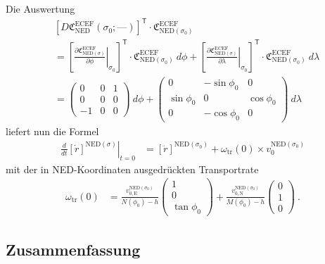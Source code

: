 \documentclass[10pt,a4paper]{article}
\newcommand{\nul}{\textrm{---}}
\newcommand{\trans}{^\mathsf{T}}
\begin{document}
Die Auswertung
\begin{align}
	&\left[
		D\mathfrak{C}^{\mathrm{ECEF}}_{\mathrm{NED}}
		\left(
			\sigma_0;
			\nul
		\right)
	\right]\trans
	\cdot
	\mathfrak{C}^{\mathrm{ECEF}}_{\mathrm{NED}(\sigma_0)}
	\nonumber\\
	&=
	\left[	
	\left.
	\frac{\partial \mathfrak{C}^{\mathrm{ECEF}}_{\mathrm{NED}(\sigma)}}
	{\partial\phi}
	\right|_{\sigma_0}
	\right]\trans	
	\cdot
	\mathfrak{C}^{\mathrm{ECEF}}_{\mathrm{NED}(\sigma_0)}
	\ d\phi
	+
	\left[	
	\left.
	\frac{\partial \mathfrak{C}^{\mathrm{ECEF}}_{\mathrm{NED}(\sigma)}}
	{\partial\lambda}
	\right|_{\sigma_0}
	\right]\trans	
	\cdot
	\mathfrak{C}^{\mathrm{ECEF}}_{\mathrm{NED}(\sigma_0)}	
	\ d\lambda
	\nonumber\\
	&=
	\begin{pmatrix}
		0 & 0 & 1\\
		0 & 0 & 0 \\
		-1 & 0 & 0
	\end{pmatrix}		
	\ d\phi
	+
	\begin{pmatrix}
		0 & -\sin\phi_0 & 0 \\
		\sin\phi_0 & 0 & \cos\phi_0 \\
		0 & -\cos\phi_0 & 0
	\end{pmatrix}		
	\ d\lambda	
\end{align}
liefert nun die Formel
\begin{align}
	\left.
	\frac{d}{dt}
	\left[
		\dot{r}
	\right]^{\mathrm{NED}(\sigma)}
	\right|_{t=0}
	&=
	\left[
		\ddot{r}
	\right]^{\mathrm{NED}(\sigma_0)}
	+ 
	\omega_{\mathrm{tr}}(0)
	\times
	v_{0}^{\mathrm{NED}(\sigma_0)}	
\end{align}
mit der in NED-Koordinaten ausgedrückten Transportrate
\begin{align}
	\omega_{\mathrm{tr}}(0)
	&=          
	\frac{v_{0,\mathrm{E}}^{\mathrm{NED}(\sigma_0)}}
         {N(\phi_0) - h}
	\begin{pmatrix}
		1 \\ 0 \\ \tan\phi_0
	\end{pmatrix}
	+
	\frac{v_{0,\mathrm{N}}^{\mathrm{NED}(\sigma_0)}}
         {M(\phi_0) - h}
	\begin{pmatrix}
		0 \\ 1 \\ 0
	\end{pmatrix} 	
	\ .
\end{align}

\subsection{Zusammenfassung}
\end{document}
